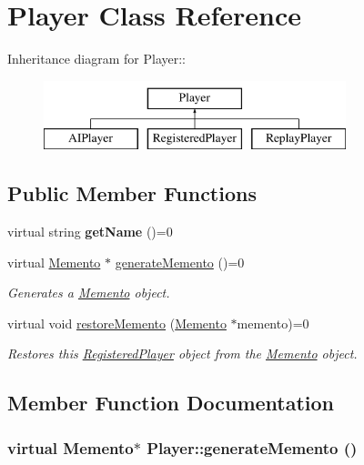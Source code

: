\hypertarget{classPlayer}{
\section{Player Class Reference}
\label{classPlayer}
}
Inheritance diagram for Player::\begin{figure}[H]
\begin{center}
\leavevmode
\includegraphics[height=2cm]{classPlayer}
\end{center}
\end{figure}
\subsection*{Public Member Functions}
\begin{DoxyCompactItemize}
\item 
\hypertarget{classPlayer_a9ca1e3c3a8ad5d89268551b93a19fcc0}{
virtual string {\bfseries getName} ()=0}
\label{classPlayer_a9ca1e3c3a8ad5d89268551b93a19fcc0}

\item 
virtual \hyperlink{classMemento}{Memento} $\ast$ \hyperlink{classPlayer_ae0b947230fe2f09d96f273798f19cf0d}{generateMemento} ()=0
\begin{DoxyCompactList}\small\item\em Generates a \hyperlink{classMemento}{Memento} object. \item\end{DoxyCompactList}\item 
virtual void \hyperlink{classPlayer_a9c4f1a1eef2fbfda4b6e19e97be91877}{restoreMemento} (\hyperlink{classMemento}{Memento} $\ast$memento)=0
\begin{DoxyCompactList}\small\item\em Restores this \hyperlink{classRegisteredPlayer}{RegisteredPlayer} object from the \hyperlink{classMemento}{Memento} object. \item\end{DoxyCompactList}\end{DoxyCompactItemize}


\subsection{Member Function Documentation}
\hypertarget{classPlayer_ae0b947230fe2f09d96f273798f19cf0d}{
\subsubsection[{generateMemento}]{\setlength{\rightskip}{0pt plus 5cm}virtual {\bf Memento}$\ast$ Player::generateMemento ()}}
\label{classPlayer_ae0b947230fe2f09d96f273798f19cf0d}


